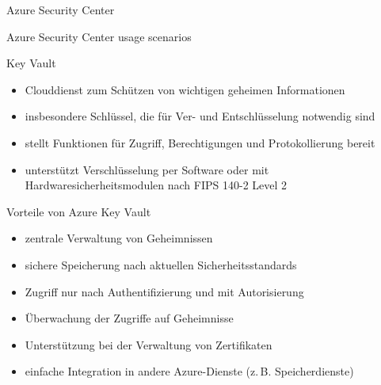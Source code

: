 \begin{flashcard}[Describe]{Azure Security Center}

\end{flashcard}

\begin{flashcard}[Understand]{Azure Security Center usage scenarios}

\end{flashcard}

\begin{flashcard}[Definition]{Key Vault}
    \begin{itemize}
        \item Clouddienst zum Schützen von wichtigen geheimen Informationen
        \item insbesondere Schlüssel, die für Ver- und Entschlüsselung notwendig sind
        \item stellt Funktionen für Zugriff, Berechtigungen und Protokollierung bereit
        \item unterstützt Verschlüsselung per Software oder mit Hardwaresicherheitsmodulen nach FIPS 140-2 Level 2
    \end{itemize}
\end{flashcard}

\begin{flashcard}[\ ]{Vorteile von Azure Key Vault}
    \begin{itemize}
        \item zentrale Verwaltung von Geheimnissen
        \item sichere Speicherung nach aktuellen Sicherheitsstandards
        \item Zugriff nur nach Authentifizierung und mit Autorisierung
        \item Überwachung der Zugriffe auf Geheimnisse
        \item Unterstützung bei der Verwaltung von Zertifikaten
        \item einfache Integration in andere Azure-Dienste (z.\,B. Speicherdienste)
    \end{itemize}

\end{flashcard}

